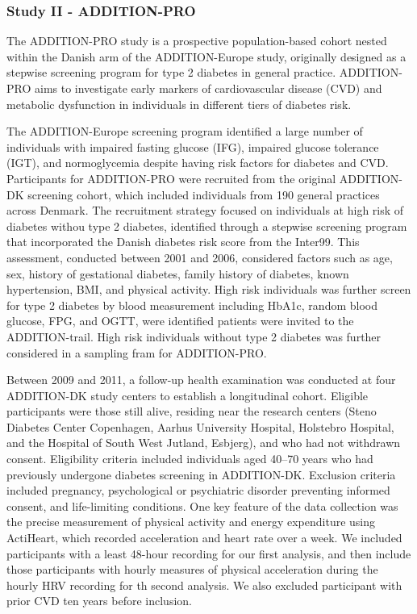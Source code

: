 \documentclass[
  a4paper,
  headsepline=true,
  open=any]{scrbook}
\begin{document}
\hypertarget{study-ii---addition-pro}{%
\subsubsection{Study II - ADDITION-PRO}\label{study-ii---addition-pro}}

The ADDITION-PRO study is a prospective population-based cohort nested
within the Danish arm of the ADDITION-Europe study, originally designed
as a stepwise screening program for type 2 diabetes in general practice.
ADDITION-PRO aims to investigate early markers of cardiovascular disease
(CVD) and metabolic dysfunction in individuals in different tiers of
diabetes risk.

The ADDITION-Europe screening program identified a large number of
individuals with impaired fasting glucose (IFG), impaired glucose
tolerance (IGT), and normoglycemia despite having risk factors for
diabetes and CVD. Participants for ADDITION-PRO were recruited from the
original ADDITION-DK screening cohort, which included individuals from
190 general practices across Denmark. The recruitment strategy focused
on individuals at high risk of diabetes withou type 2 diabetes,
identified through a stepwise screening program that incorporated the
Danish diabetes risk score from the Inter99. This assessment, conducted
between 2001 and 2006, considered factors such as age, sex, history of
gestational diabetes, family history of diabetes, known hypertension,
BMI, and physical activity. High risk individuals was further screen for
type 2 diabetes by blood measurement including HbA1c, random blood
glucose, FPG, and OGTT, were identified patients were invited to the
ADDITION-trail. High risk individuals without type 2 diabetes was
further considered in a sampling fram for ADDITION-PRO.

Between 2009 and 2011, a follow-up health examination was conducted at
four ADDITION-DK study centers to establish a longitudinal cohort.
Eligible participants were those still alive, residing near the research
centers (Steno Diabetes Center Copenhagen, Aarhus University Hospital,
Holstebro Hospital, and the Hospital of South West Jutland, Esbjerg),
and who had not withdrawn consent. Eligibility criteria included
individuals aged 40--70 years who had previously undergone diabetes
screening in ADDITION-DK. Exclusion criteria included pregnancy,
psychological or psychiatric disorder preventing informed consent, and
life-limiting conditions. One key feature of the data collection was the
precise measurement of physical activity and energy expenditure using
ActiHeart, which recorded acceleration and heart rate over a week. We
included participants with a least 48-hour recording for our first
analysis, and then include those participants with hourly measures of
physical acceleration during the hourly HRV recording for th second
analysis. We also excluded participant with prior CVD ten years before
inclusion.
\end{document}
